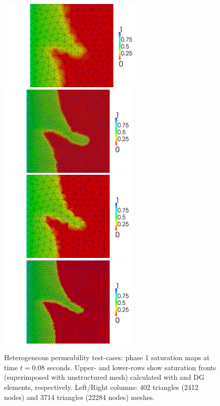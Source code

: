 \begin{figure}[h]
\vbox{\hbox{
\hspace{-1.8cm}\includegraphics[width=0.6\textwidth]{./diagrams/CG_coarse083.png}
\hspace{-0.2cm}\includegraphics[width=0.6\textwidth]{./diagrams/CG_fine083.png}}
\vspace{1.cm}\hbox{
\hspace{-1.8cm}\includegraphics[width=0.6\textwidth]{./diagrams/DG_coarse083.png}
\hspace{-0.2cm}\includegraphics[width=0.6\textwidth]{./diagrams/DG_fine083.png}}}
 \caption{Heterogeneous permeability test-cases: phase 1 saturation maps at time $t=0.08$ seconds. Upper- and lower-rows show saturation fronts (superimposed with unstructured mesh) calculated with  and DG elements, respectively. Left/Right columns: 402 triangles (2412 nodes) and 3714 triangles (22284 nodes) meshes.\label{fig:4reg_maps}}
\end{figure}

